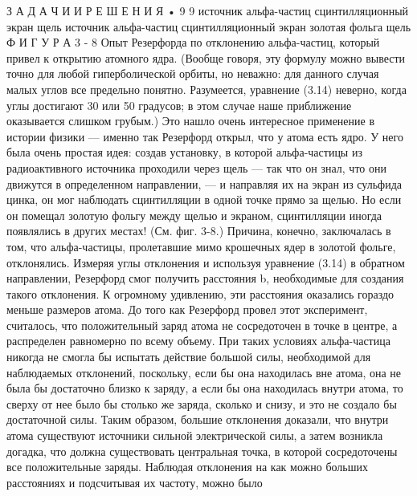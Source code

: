 \documentclass[10pt,oneside]{article}
\begin{document}
З А Д А Ч И  И  Р Е Ш Е Н И Я • 9 9 источник альфа-частиц сцинтилляционный экран щель источник альфа-частиц сцинтилляционный экран золотая фольга щель Ф И Г У Р А  3 - 8 Опыт Резерфорда по отклонению альфа-частиц, который привел к открытию атомного ядра. (Вообще говоря, эту формулу можно вывести точно для любой гиперболической орбиты, но неважно: для данного случая малых углов все предельно понятно. Разумеется, уравнение (3.14) неверно, когда углы достигают 30 или 50 градусов; в этом случае наше приближение оказывается слишком грубым.) Это нашло очень интересное применение в истории физики --- именно так Резерфорд открыл, что у атома есть ядро. У него была очень простая идея: создав установку, в которой альфа-частицы из радиоактивного источника проходили через щель --- так что он знал, что они движутся в определенном направлении, --- и направляя их на экран из сульфида цинка, он мог наблюдать сцинтилляции в одной точке прямо за щелью. Но если он помещал золотую фольгу между щелью и экраном, сцинтилляции иногда появлялись в других местах! (См. фиг. 3-8.) Причина, конечно, заключалась в том, что альфа-частицы, пролетавшие мимо крошечных ядер в золотой фольге, отклонялись. Измеряя углы отклонения и используя уравнение (3.14) в обратном направлении, Резерфорд смог получить расстояния b, необходимые для создания такого отклонения. К огромному удивлению, эти расстояния оказались гораздо меньше размеров атома. До того как Резерфорд провел этот эксперимент, считалось, что положительный заряд атома не сосредоточен в точке в центре, а распределен равномерно по всему объему. При таких условиях альфа-частица никогда не смогла бы испытать действие большой силы, необходимой для наблюдаемых отклонений, поскольку, если бы она находилась вне атома, она не была бы достаточно близко к заряду, а если бы она находилась внутри атома, то сверху от нее было бы столько же заряда, сколько и снизу, и это не создало бы достаточной силы. Таким образом, большие отклонения доказали, что внутри атома существуют источники сильной электрической силы, а затем возникла догадка, что должна существовать центральная точка, в которой сосредоточены все положительные заряды. Наблюдая отклонения на как можно больших расстояниях и подсчитывая их частоту, можно было\par
\end{document}
